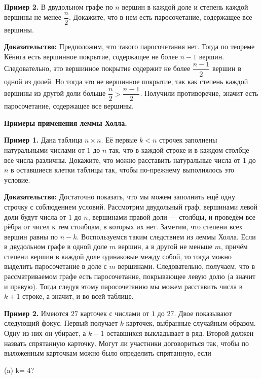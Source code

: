 \textbf{Пример 2.} В двудольном графе по $n$ вершин в каждой доле и степень каждой вершины не менее $\dfrac{n}{2}$. Докажите, что в нем есть паросочетание, содержащее все вершины.

\textbf{Доказательство:} Предположим, что такого паросочетания нет. Тогда по теореме Кёнига есть вершинное покрытие, содержащее не более $n - 1$ вершин. Следовательно, это вершинное покрытие содержит не более $\dfrac{n-1}{2}$ вершин в одной из долей. Но тогда это не вершинное покрытие, так как степень каждой вершины из другой доли больше $\dfrac{n}{2} > \dfrac{n-1}{2}$. Получили противоречие, значит есть паросочетание, содержащее все вершины.

\textbf{\Large Примеры применения леммы Холла.}

\textbf{Пример 1.} Дана таблица $n \times n$.   Её первые $k < n$   строчек заполнены натуральными числами от $1$ до $n$ так, что в каждой строке и в каждом столбце все числа различны. Докажите, что можно расставить натуральные числа от $1$ до $n$ в оставшиеся клетки таблицы так, чтобы по-прежнему выполнялось это условие.


\newpage

\hspace{3mm}

\textbf{Доказательство:} Достаточно показать, что мы можем заполнить ещё одну строчку с соблюдением условий. Рассмотрим двудольный граф, вершинами левой доли будут числа от $1$   до $n$,   вершинами правой доли --- столбцы, и проведём все рёбра от чисел к тем столбцам, в которых их нет. Заметим, что степени всех вершин равны по $n - k$.   Воспользуемся таким следствием из леммы Холла. Если в двудольном графе в одной доле $m$   вершин, а в другой не меньше $m$, причём степени вершин в каждой доле одинаковые между собой, то тогда можно выделить паросочетание в доле с $m$ вершинами. Следовательно, получаем, что в рассматриваемом графе есть паросочетание, покрывающее левую долю (а значит и правую). Тогда следуя этому паросочетанию мы можем расставить числа в $k + 1$   строке, а значит, и во всей таблице.

\textbf{Пример 2.} Имеются $27$   карточек с числами от $1$ до $27$.   Двое показывают следующий фокус. Первый получает $k$ карточек, выбранные случайным образом. Одну из них он убирает, а $k - 1$ оставшихся выкладывает в ряд. Второй должен назвать спрятанную карточку. Могут ли участники договориться так, чтобы по выложенным карточкам можно было определить спрятанную, если

(a) k= 4?  

